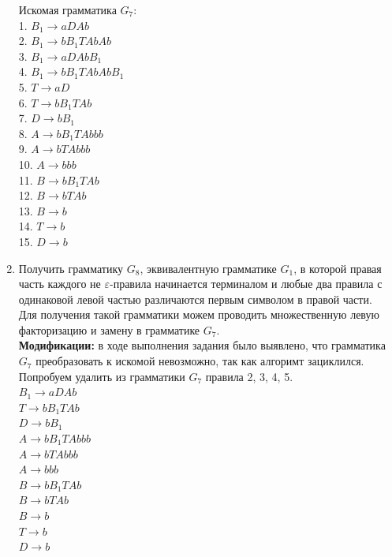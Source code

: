 \documentclass[a4paper,14pt]{extarticle}
\begin{document}
\begin{enumerate}[1.]
Искомая грамматика $G_7$:\\
1. $B_1 \rightarrow aDAb$\\
2. $B_1 \rightarrow bB_1TAbAb$\\
3. $B_1 \rightarrow aDAbB_1$\\
4. $B_1 \rightarrow bB_1TAbAbB_1$\\
5. $T \rightarrow aD$\\ 
6. $T \rightarrow bB_1TAb$\\
7. $D \rightarrow bB_1$\\
8. $A \rightarrow bB_1TAbbb$\\
9. $A \rightarrow bTAbbb$\\
10. $A \rightarrow bbb$\\
11. $B \rightarrow bB_1TAb$\\ 
12. $B \rightarrow bTAb$\\ 
13. $B \rightarrow b$\\
14. $T \rightarrow b$\\
15. $D \rightarrow b$\\

\item Получить грамматику $G_8$, эквивалентную грамматике $G_1$, в которой 
правая часть каждого не $\varepsilon$-правила начинается терминалом и любые
два правила с одинаковой левой частью различаются первым символом в правой части.\\
Для получения такой грамматики можем проводить множественную левую факторизацию и замену в грамматике $G_7$.\\

\textbf{Модификации: }в ходе выполнения задания было выявлено, что грамматика $G_7$
преобразовать к искомой невозможно, так как алгоримт зациклился.
Попробуем удалить из грамматики $G_7$ правила 2, 3, 4, 5.\\
$B_1 \rightarrow aDAb$\\
$T \rightarrow bB_1TAb$\\
$D \rightarrow bB_1$\\
$A \rightarrow bB_1TAbbb$\\
$A \rightarrow bTAbbb$\\
$A \rightarrow bbb$\\
$B \rightarrow bB_1TAb$\\ 
$B \rightarrow bTAb$\\ 
$B \rightarrow b$\\
$T \rightarrow b$\\
$D \rightarrow b$\\


\end{enumerate}
\end{document}
